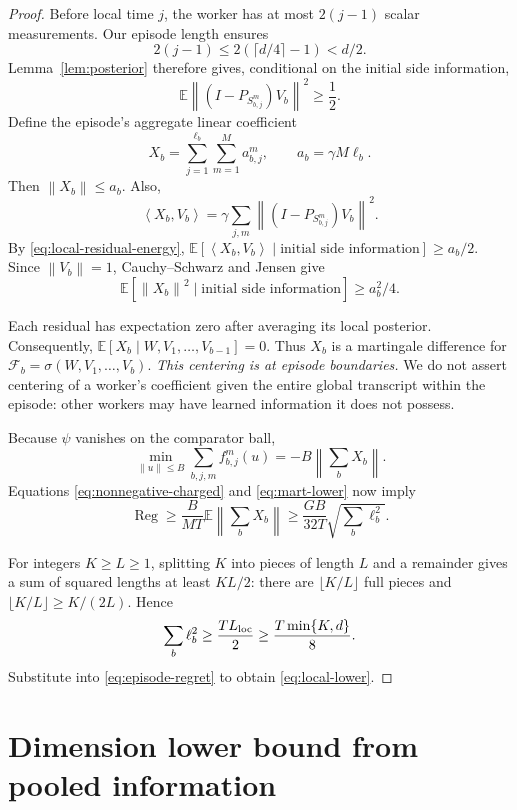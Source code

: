 \documentclass[11pt,a4paper]{article}
\numberwithin{equation}{section}
\theoremstyle{remark}
\newcommand{\E}{\mathbb E}
\newcommand{\norm}[1]{\left\lVert #1\right\rVert}
\newcommand{\ip}[2]{\left\langle #1,#2\right\rangle}
\begin{document}
\begin{proof}
Before local time $j$, the worker has at most $2(j-1)$ scalar
measurements. Our episode length ensures
\[
 2(j-1)\le2(\lceil d/4\rceil-1)<d/2.
\]
Lemma~\ref{lem:posterior} therefore gives, conditional on the initial
side information,
\begin{equation}
 \E\norm{(I-P_{S_{b,j}^m})V_b}^2\ge\frac12.
 \label{eq:local-residual-energy}
\end{equation}
Define the episode's aggregate linear coefficient
\[
 X_b=\sum_{j=1}^{\ell_b}\sum_{m=1}^Ma_{b,j}^m,\qquad
 a_b=\gamma M\ell_b.
\]
Then $\norm{X_b}\le a_b$. Also,
\[
 \ip{X_b}{V_b}
 =\gamma\sum_{j,m}\norm{(I-P_{S_{b,j}^m})V_b}^2.
\]
By \eqref{eq:local-residual-energy},
$\E[\ip{X_b}{V_b}\mid\text{initial side information}]\ge a_b/2$.
Since $\norm{V_b}=1$, Cauchy--Schwarz and Jensen give
\begin{equation}
 \E[\norm{X_b}^2\mid\text{initial side information}]\ge a_b^2/4.
 \label{eq:episode-energy}
\end{equation}

Each residual has expectation zero after averaging its local posterior.
Consequently,
$\E[X_b\mid W,V_1,\ldots,V_{b-1}]=0$.
Thus $X_b$ is a martingale difference for
$\mathcal F_b=\sigma(W,V_1,\ldots,V_b)$.
\emph{This centering is at episode boundaries.}
We do not assert centering of a worker's coefficient given the entire
global transcript within the episode: other workers may have learned
information it does not possess.

Because $\psi$ vanishes on the comparator ball,
\[
 \min_{\norm u\le B}\sum_{b,j,m}f_{b,j}^m(u)
 =-B\norm{\sum_bX_b}.
\]
Equations \eqref{eq:nonnegative-charged} and
\eqref{eq:mart-lower} now imply
\begin{equation}
 \operatorname{Reg}\ge
 \frac{B}{MT}\E\norm{\sum_bX_b}
 \ge\frac{GB}{32T}\sqrt{\sum_b\ell_b^2}. \label{eq:episode-regret}
\end{equation}

For integers $K\ge L\ge1$, splitting $K$ into pieces of length $L$
and a remainder gives a sum of squared lengths at least $KL/2$:
there are $\lfloor K/L\rfloor$ full pieces and
$\lfloor K/L\rfloor\ge K/(2L)$. Hence
\[
 \sum_b\ell_b^2\ge\frac{TL_{\rm loc}}2
 \ge\frac{T\min\{K,d\}}8.
\]
Substitute into \eqref{eq:episode-regret} to obtain
\eqref{eq:local-lower}.
\end{proof}

\section{Dimension lower bound from pooled information}
\label{sec:global}
\end{document}
